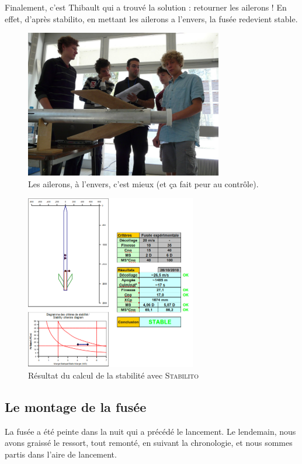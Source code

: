 \documentclass[a4paper,12pt]{scrartcl}
\begin{document}
	    Finalement, c'est Thibault qui a trouvé la solution : retourner les ailerons ! En effet, d'après stabilito, en mettant les ailerons a l'envers, la fusée redevient stable.
	      \begin{figure}[H]
		    \begin{center}
		      \caption{Les ailerons, à l'envers, c'est mieux (et ça fait peur au contrôle).}
		      \includegraphics[height=244px, width=326px]{Photos_Mercury/ailerons-controles.jpg}
		    \end{center}
	      \end{figure}
	      
	     \begin{figure}[H]
		    \begin{center}
		      \caption{Résultat du calcul de la stabilité avec \textsc{Stabilito}}
		      \includegraphics[height=289px, width=282px]{Photos_Mercury/stabilite.png}
		    \end{center}
	      \end{figure}

	  \subsection{Le montage de la fusée}
	   La fusée a été peinte dans la nuit qui a précédé le lancement.
	   Le lendemain, nous avons graissé le ressort, tout remonté, en suivant la chronologie, et nous sommes partis dans l'aire de lancement.
\end{document}
